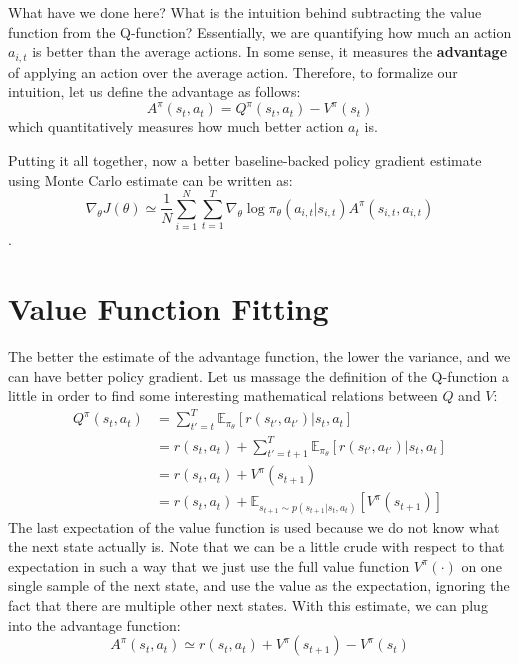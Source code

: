What have we done here? What is the intuition behind subtracting the value function from the Q-function? Essentially, we are quantifying how much an action $a_{i,t}$ is better than the average actions. In some sense, it measures the \textbf{advantage} of applying an action over the average action. Therefore, to formalize our intuition, let us define the advantage as follows:
$$A^\pi(s_t,a_t) = Q^\pi(s_t,a_t) - V^\pi(s_t)$$
which quantitatively measures how much better action $a_t$ is.

Putting it all together, now a better baseline-backed policy gradient estimate using Monte Carlo estimate can be written as:
$$\nabla_\theta J(\theta) \simeq \frac{1}{N}\sum_{i=1}^N\sum_{t=1}^T\nabla_{\theta}\log \pi_\theta (a_{i,t}|s_{i,t})A^\pi(s_{i,t},a_{i,t})$$.

\section{Value Function Fitting}
The better the estimate of the advantage function, the lower the variance, and we can have better policy gradient. Let us massage the definition of the Q-function a little in order to find some interesting mathematical relations between $Q$ and $V$:
\begin{align*}
    Q^\pi(s_t,a_t) &= \sum_{t'=t}^T \mathbb{E}_{\pi_\theta}\left[r(s_{t'},a_{t'})|s_t,a_t\right]\\
    &= r(s_t,a_t)+\sum_{t'=t+1}^T \mathbb{E}_{\pi_\theta}\left[r(s_{t'},a_{t'})|s_t,a_t\right]\\
    &= r(s_t,a_t) + V^\pi(s_{t+1})\\
    &= r(s_t,a_t) + \mathbb{E}_{s_{t+1}\sim p(s_{t+1}|s_t,a_t)}\left[V^\pi(s_{t+1})\right]
\end{align*}
The last expectation of the value function is used because we do not know what the next state actually is. Note that we can be a little crude with respect to that expectation in such a way that we just use the full value function $V^\pi(\cdot)$ on one single sample of the next state, and use the value as the expectation, ignoring the fact that there are multiple other next states. With this estimate, we can plug into the advantage function:
$$A^\pi(s_t,a_t) \simeq r(s_t,a_t) + V^\pi(s_{t+1}) - V^\pi(s_t)$$

